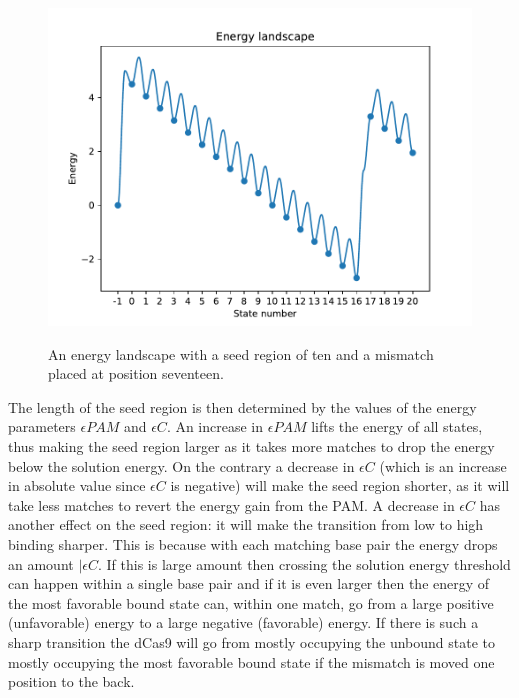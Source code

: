 \begin{figure}[H]
\begin{center}
\includegraphics[width=\textwidth]{images/seedregionexample2}
\label{fig:seedregionexample2}
\caption{An energy landscape with a seed region of ten and a mismatch placed at position seventeen.}
\end{center}
\end{figure}

The length of the seed region is then determined by the values of the energy parameters $\epsilon PAM$ and $\epsilon C$. An increase in $\epsilon PAM$ lifts the energy of all states, thus making the seed region larger as it takes more matches to drop the energy below the solution energy. On the contrary a decrease in $\epsilon C$ (which is an increase in absolute value since $\epsilon C$ is negative) will make the seed region shorter, as it will take less matches to revert the energy gain from the PAM. A decrease in $\epsilon C$ has another effect on the seed region: it will make the transition from low to high binding sharper. This is because with each matching base pair the energy drops an amount $|\epsilon C$. If this is large amount then crossing the solution energy threshold can happen within a single base pair and if it is even larger then the energy of the most favorable bound state can, within one match, go from a large positive (unfavorable) energy to a large negative (favorable) energy. If there is such a sharp transition the dCas9 will go from mostly occupying the unbound state to mostly occupying the most favorable bound state if the mismatch is moved one position to the back.

